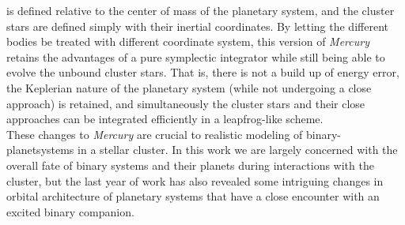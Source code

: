 \documentclass[manuscript]{aastex631}
\begin{document}
is defined relative to the center of mass of the planetary system, and the cluster stars are defined simply with their inertial coordinates. By letting the different
bodies be treated with different coordinate system, this version of \textit{Mercury} retains the advantages of a pure symplectic integrator while still being able 
to evolve the unbound cluster stars. That is, there is not a build up of energy error, the Keplerian nature of the planetary system (while not undergoing a close approach)
is retained, and simultaneously the cluster stars and their close approaches can be integrated efficiently in a leapfrog-like scheme. \\
\indent These changes to \textit{Mercury} are crucial to realistic modeling of binary-planetsystems in a stellar cluster.
 In this work we are largely concerned with the overall fate of binary systems and their planets during interactions with the cluster, but the last year of 
work has also revealed some intriguing changes in orbital architecture of planetary systems that have a close encounter with an excited binary companion.\\
\end{document}

